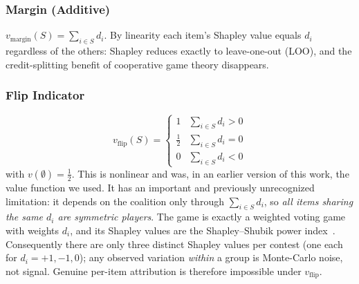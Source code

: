 \documentclass[conference]{IEEEtran}
\begin{document}
\subsubsection{Margin (Additive)} $v_{\text{margin}}(S) = \sum_{i \in S} d_i$.
By linearity each item's Shapley value equals $d_i$ regardless of the others: Shapley reduces exactly to leave-one-out (LOO), and the credit-splitting benefit of cooperative game theory disappears.

\subsubsection{Flip Indicator}
\begin{equation}
    v_{\text{flip}}(S) = \begin{cases}
        1 & \sum_{i \in S} d_i > 0 \\
        \tfrac12 & \sum_{i \in S} d_i = 0 \\
        0 & \sum_{i \in S} d_i < 0
    \end{cases}
    \label{eq:value}
\end{equation}
with $v(\emptyset) = \tfrac12$.
This is nonlinear and was, in an earlier version of this work, the value function we used.
It has an important and previously unrecognized limitation: it depends on the coalition only through $\sum_{i\in S} d_i$, so \emph{all items sharing the same $d_i$ are symmetric players}.
The game is exactly a weighted voting game with weights $d_i$, and its Shapley values are the Shapley--Shubik power index~\cite{shapleyshubik1954}.
Consequently there are only three distinct Shapley values per contest (one each for $d_i=+1,-1,0$); any observed variation \emph{within} a group is Monte-Carlo noise, not signal.
Genuine per-item attribution is therefore impossible under $v_{\text{flip}}$.
\end{document}

